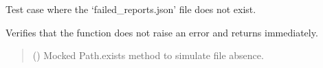 \documentclass[letterpaper,10pt,english]{sphinxmanual}
\begin{document}
\begin{fulllineitems}
\label{\detokenize{test.data_storage:test.data_storage.test_retry_failed_reports.test_no_failed_json}}
\pysigstartsignatures
\pysiglinewithargsret
{}
{}
{}
\pysigstopsignatures
\sphinxAtStartPar
Test case where the ‘failed\_reports.json’ file does not exist.

\sphinxAtStartPar
Verifies that the function does not raise an error and returns immediately.
\begin{quote}\begin{description}
\sphinxAtStartPar
{} () \textendash{} Mocked Path.exists method to simulate file absence.

\end{description}\end{quote}

\end{fulllineitems}

\end{document}

